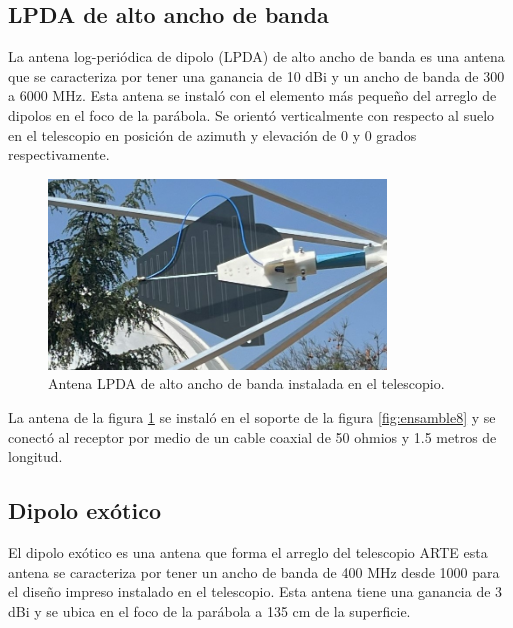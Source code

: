 \subsection{LPDA de alto ancho de banda}

La antena log-periódica de dipolo (LPDA) de alto ancho de banda es una antena que se caracteriza por tener una ganancia de 10 dBi y un ancho de banda de 300 a 6000 MHz. Esta antena se instaló con el elemento más pequeño del arreglo de dipolos en el foco de la parábola. Se orientó verticalmente con respecto al suelo en el telescopio en posición de azimuth y elevación de 0 y 0 grados respectivamente.\\

\begin{figure}
    \centering
    \includegraphics[width=0.8\textwidth]{img/lpda}
    \caption{Antena LPDA de alto ancho de banda instalada en el telescopio.}
    \label{fig:ensamble13}
\end{figure}

La antena de la figura \ref{fig:ensamble13} se instaló en el soporte de la figura \ref{fig:ensamble8} y se conectó al receptor por medio de un cable coaxial de 50 ohmios y 1.5 metros de longitud.\\

\subsection{Dipolo exótico}

El dipolo exótico es una antena que forma el arreglo del telescopio ARTE \cite{Gallardo2023} esta antena se caracteriza por tener un ancho de banda de 400 MHz desde 1000 para el diseño impreso instalado en el telescopio. Esta antena tiene una ganancia de 3 dBi y se ubica en el foco de la parábola a 135 cm de la superficie.\\

